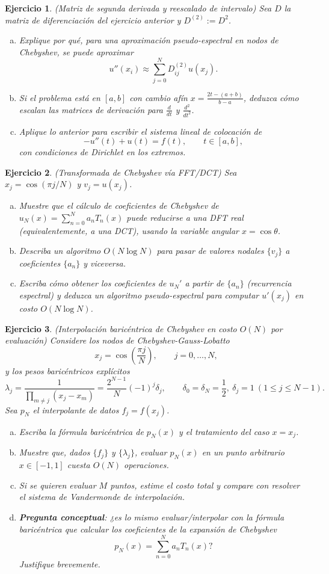 \documentclass[12pt]{article}
\newtheorem{exercise}{Ejercicio}
\newcommand{\bej}{\begin{exercise}\rm}
\newcommand{\fej}{\end{exercise}}
\begin{document}
\bej
(Matriz de segunda derivada y reescalado de intervalo)
Sea $D$ la matriz de diferenciación del ejercicio anterior y $D^{(2)}:=D^2$.
\begin{enumerate}[(a)]
    \item Explique por qué, para una aproximación pseudo-espectral en nodos de Chebyshev, se puede aproximar
    \[
    u''(x_i)\approx \sum_{j=0}^{N}D^{(2)}_{ij}u(x_j).
    \]
    \item Si el problema está en $[a,b]$ con cambio afín $x=\frac{2t-(a+b)}{b-a}$, deduzca cómo escalan las matrices de derivación para $\frac{d}{dt}$ y $\frac{d^2}{dt^2}$.
    \item Aplique lo anterior para escribir el sistema lineal de colocación de
    \[
    -u''(t)+u(t)=f(t),\qquad t\in[a,b],
    \]
    con condiciones de Dirichlet en los extremos.
\end{enumerate}
\fej

\bej
(Transformada de Chebyshev vía FFT/DCT)
Sea $x_j=\cos(\pi j/N)$ y $v_j=u(x_j)$.
\begin{enumerate}[(a)]
    \item Muestre que el cálculo de coeficientes de Chebyshev de $u_N(x)=\sum_{n=0}^{N}a_nT_n(x)$ puede reducirse a una DFT real (equivalentemente, a una DCT), usando la variable angular $x=\cos\theta$.
    \item Describa un algoritmo $O(N\log N)$ para pasar de valores nodales $\{v_j\}$ a coeficientes $\{a_n\}$ y viceversa.
    \item Escriba cómo obtener los coeficientes de $u_N'$ a partir de $\{a_n\}$ (recurrencia espectral) y deduzca un algoritmo pseudo-espectral para computar $u'(x_j)$ en costo $O(N\log N)$.
\end{enumerate}
\fej

\bej
(Interpolación baricéntrica de Chebyshev en costo $O(N)$ por evaluación)
Considere los nodos de Chebyshev-Gauss-Lobatto
\[
x_j=\cos\left(\frac{\pi j}{N}\right),\qquad j=0,\ldots,N,
\]
y los pesos baricéntricos explícitos
\[
\lambda_j=\frac{1}{\prod_{m\ne j}(x_j-x_m)}
=\frac{2^{N-1}}{N}(-1)^j\delta_j,
\qquad
\delta_0=\delta_N=\frac12,\ \delta_j=1\ (1\le j\le N-1).
\]
Sea $p_N$ el interpolante de datos $f_j=f(x_j)$.
\begin{enumerate}[(a)]
    \item Escriba la fórmula baricéntrica de $p_N(x)$ y el tratamiento del caso $x=x_j$.
    \item Muestre que, dados $\{f_j\}$ y $\{\lambda_j\}$, evaluar $p_N(x)$ en un punto arbitrario $x\in[-1,1]$ cuesta $O(N)$ operaciones.
    \item Si se quieren evaluar $M$ puntos, estime el costo total y compare con resolver el sistema de Vandermonde de interpolación.
    \item \textbf{Pregunta conceptual}: ¿es lo mismo evaluar/interpolar con la fórmula baricéntrica que calcular los coeficientes de la expansión de Chebyshev
    \[
    p_N(x)=\sum_{n=0}^{N}a_nT_n(x)?
    \]
    Justifique brevemente.
\end{enumerate}
\fej
\end{document}
